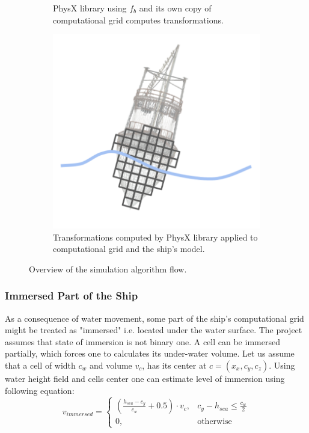 \documentclass{report}
\begin{document}
\begin{figure}[htb]
\begin{subfigure}{0.25\textwidth}
  \caption{PhysX library using $f_b$ and its own copy of computational grid computes transformations.}
  \label{fig:ship_algo_5}
\end{subfigure}\hfil %
\begin{subfigure}{0.25\textwidth}
  \includegraphics[width=\linewidth]{images/ship_algo_6.pdf}
  \caption{Transformations computed by PhysX library applied to computational grid and the ship's model.}
  \label{fig:ship_algo_6}
\end{subfigure}
\caption{Overview of the simulation algorithm flow.}
\label{fig:images}
\end{figure}

\subsubsection{Immersed Part of the Ship}
As a consequence of water movement, some part of the ship's computational grid might be treated as "immersed" i.e. located under the water surface. The project assumes that state of immersion is not binary one. A cell can be immersed partially, which forces one to calculates its under-water volume. Let us assume that a cell of width $c_w$ and volume $v_c$, has its center at $c=(x_x, c_y, c_z)$. Using water height field and cells center one can estimate level of immersion using following equation:
\begin{equation}\label{eq:immersion}
    v_{immersed} = 
    \begin{cases}
        (\frac{h_{sea} - c_y}{c_w} + 0.5)\cdot v_c,& c_y - h_{sea} \leqslant \frac{c_w}{2}\\
        0 ,              & \text{otherwise}
    \end{cases}
\end{equation}
\end{document}
